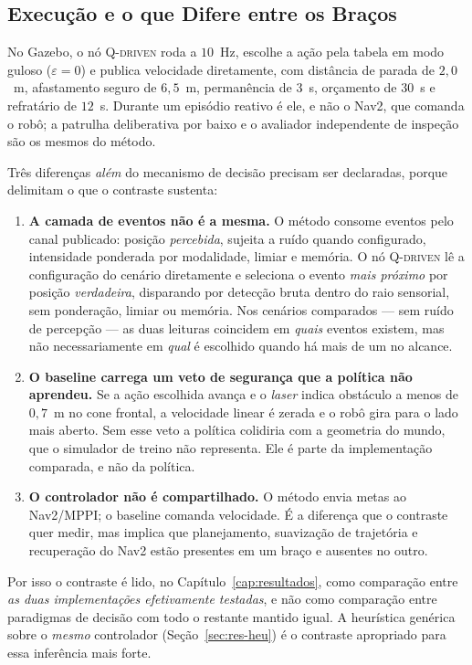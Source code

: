 \subsection{Execução e o que Difere entre os Braços}

No Gazebo, o nó \textsc{Q-driven} roda a $10$~Hz, escolhe a ação pela tabela em modo
guloso ($\varepsilon=0$) e publica velocidade diretamente, com distância de parada de
$2{,}0$~m, afastamento seguro de $6{,}5$~m, permanência de $3$~s, orçamento de $30$~s e
refratário de $12$~s. Durante um episódio reativo é ele, e não o Nav2, que comanda o
robô; a patrulha deliberativa por baixo e o avaliador independente de inspeção são os
mesmos do método.

Três diferenças \emph{além} do mecanismo de decisão precisam ser declaradas, porque
delimitam o que o contraste sustenta:

\begin{enumerate}
    \item \textbf{A camada de eventos não é a mesma.} O método consome eventos pelo
    canal publicado: posição \emph{percebida}, sujeita a ruído quando configurado,
    intensidade ponderada por modalidade, limiar e memória. O nó \textsc{Q-driven} lê a
    configuração do cenário diretamente e seleciona o evento \emph{mais próximo} por
    posição \emph{verdadeira}, disparando por detecção bruta dentro do raio sensorial,
    sem ponderação, limiar ou memória. Nos cenários comparados --- sem ruído de
    percepção --- as duas leituras coincidem em \emph{quais} eventos existem, mas não
    necessariamente em \emph{qual} é escolhido quando há mais de um no alcance.
    \item \textbf{O baseline carrega um veto de segurança que a política não aprendeu.}
    Se a ação escolhida avança e o \textit{laser} indica obstáculo a menos de $0{,}7$~m
    no cone frontal, a velocidade linear é zerada e o robô gira para o lado mais aberto.
    Sem esse veto a política colidiria com a geometria do mundo, que o simulador de
    treino não representa. Ele é parte da implementação comparada, e não da política.
    \item \textbf{O controlador não é compartilhado.} O método envia metas ao
    Nav2/MPPI; o baseline comanda velocidade. É a diferença que o contraste quer medir,
    mas implica que planejamento, suavização de trajetória e recuperação do Nav2 estão
    presentes em um braço e ausentes no outro.
\end{enumerate}

Por isso o contraste é lido, no Capítulo~\ref{cap:resultados}, como comparação entre
\emph{as duas implementações efetivamente testadas}, e não como comparação entre
paradigmas de decisão com todo o restante mantido igual. A heurística genérica sobre o
\emph{mesmo} controlador (Seção~\ref{sec:res-heu}) é o contraste apropriado para essa
inferência mais forte.


